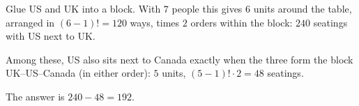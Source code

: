 Glue US and UK into a block. With $7$ people this gives $6$ units around the table, arranged in $(6-1)!=120$ ways, times $2$ orders within the block: $240$ seatings with US next to UK.

Among these, US also sits next to Canada exactly when the three form the block UK--US--Canada (in either order): $5$ units, $(5-1)!\cdot2=48$ seatings.

The answer is $240-48=\boxed{192}$.
